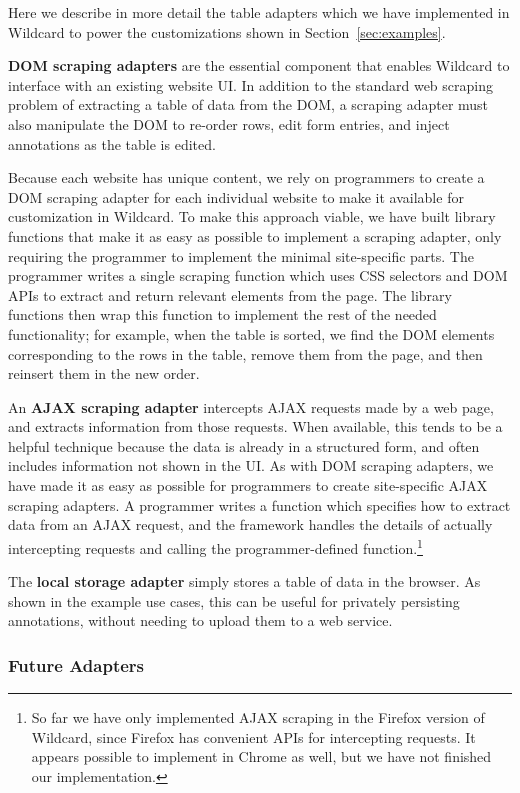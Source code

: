 \documentclass[sigplan,10pt,anonymous,review]{acmart}
\begin{document}
Here we describe in more detail the table adapters which we have
implemented in Wildcard to power the customizations shown in
Section~\ref{sec:examples}.

\textbf{DOM scraping adapters} are the essential component that enables
Wildcard to interface with an existing website UI. In addition to the
standard web scraping problem of extracting a table of data from the
DOM, a scraping adapter must also manipulate the DOM to re-order rows,
edit form entries, and inject annotations as the table is edited.

Because each website has unique content, we rely on programmers to
create a DOM scraping adapter for each individual website to make it
available for customization in Wildcard. To make this approach viable,
we have built library functions that make it as easy as possible to
implement a scraping adapter, only requiring the programmer to implement
the minimal site-specific parts. The programmer writes a single scraping
function which uses CSS selectors and DOM APIs to extract and return
relevant elements from the page. The library functions then wrap this
function to implement the rest of the needed functionality; for example,
when the table is sorted, we find the DOM elements corresponding to the
rows in the table, remove them from the page, and then reinsert them in
the new order.

An \textbf{AJAX scraping adapter} intercepts AJAX requests made by a web
page, and extracts information from those requests. When available, this
tends to be a helpful technique because the data is already in a
structured form, and often includes information not shown in the UI. As
with DOM scraping adapters, we have made it as easy as possible for
programmers to create site-specific AJAX scraping adapters. A programmer
writes a function which specifies how to extract data from an AJAX
request, and the framework handles the details of actually intercepting
requests and calling the programmer-defined function.\footnote{So far we
  have only implemented AJAX scraping in the Firefox version of
  Wildcard, since Firefox has convenient APIs for intercepting requests.
  It appears possible to implement in Chrome as well, but we have not
  finished our implementation.}

The \textbf{local storage adapter} simply stores a table of data in the
browser. As shown in the example use cases, this can be useful for
privately persisting annotations, without needing to upload them to a
web service.

\hypertarget{future-adapters}{%
\subsubsection{Future Adapters}\label{future-adapters}}
\end{document}
